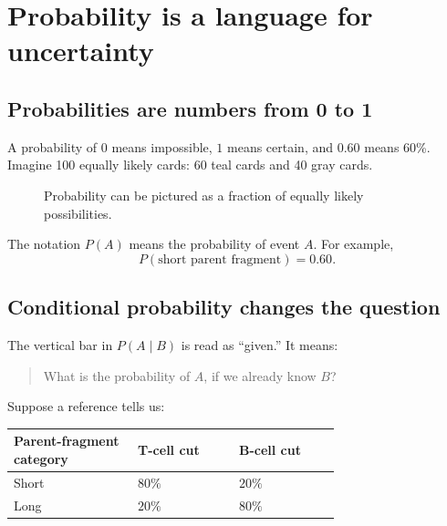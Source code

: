 \documentclass[11pt]{article}
\begin{document}
\section{Probability is a language for uncertainty}

\subsection{Probabilities are numbers from 0 to 1}

A probability of \(0\) means impossible, \(1\) means certain, and \(0.60\) means
60\%. Imagine 100 equally likely cards: 60 teal cards and 40 gray cards.

\begin{figure}[H]
\centering
{}
\caption{Probability can be pictured as a fraction of equally likely possibilities.}
\end{figure}

The notation \(P(A)\) means the probability of event \(A\). For example,
\[
P(\text{short parent fragment})=0.60.
\]

\subsection{Conditional probability changes the question}

The vertical bar in \(P(A\mid B)\) is read as “given.” It means:

\begin{quote}
What is the probability of \(A\), if we already know \(B\)?
\end{quote}

Suppose a reference tells us:

\begin{center}
\begin{tabular}{L{0.27\linewidth}C{0.22\linewidth}C{0.22\linewidth}}
\toprule
Parent-fragment category & T-cell cut & B-cell cut \\
\midrule
Short & \(80\%\) & \(20\%\) \\
Long & \(20\%\) & \(80\%\) \\
\bottomrule
\end{tabular}
\end{center}
\end{document}
